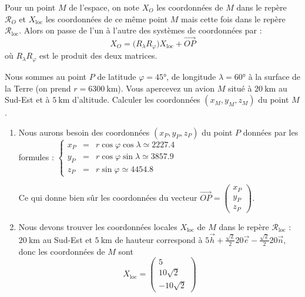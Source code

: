 \documentclass[class=report,crop=false]{standalone}
\newcommand{\vect}{\overrightarrow}
\begin{document}
Pour un point $M$ de l'espace, on note
$X_O$ les coordonnées de $M$ dans le repère $\mathcal{R}_O$
et $X_{\text{loc}}$ les coordonnées de ce même point $M$ 
mais cette fois dans le repère $\mathcal{R}_{\text{loc}}$.
Alors on passe de l'un à l'autre des systèmes de coordonnées par :
$$X_O =  \big(R_\lambda R_\varphi\big) X_{\text{loc}} + \vect{OP}$$
où $R_\lambda R_\varphi$ est le produit des deux matrices.

\begin{exemple}
Nous sommes au point $P$ de latitude $\varphi = \ang{45}$, de longitude 
$\lambda = \ang{60}$ à la surface de la Terre (on prend $r= \SI{6300}{\kilo\meter}$).
Vous apercevez un avion $M$ situé à $\SI{20}{\kilo\meter}$ au Sud-Est et à 
$\SI{5}{\kilo\meter}$ d'altitude. Calculer les coordonnées $(x_M,y_M,z_M)$ du point $M$.

\begin{enumerate}
  \item Nous aurons besoin des coordonnées $(x_P,y_P,z_P)$ du point $P$ données
par les formules :
$\left\{\begin{array}{rcl}
x_P & = & r \cos \varphi \cos \lambda \simeq \num{2227.4}\\
y_P & = & r \cos \varphi \sin \lambda \simeq \num{3857.9}\\
z_P & = & r \sin \varphi \simeq \num{4454.8}
\end{array}\right.$

Ce qui donne bien sûr les coordonnées du vecteur 
$\vect{OP}=\left(\begin{smallmatrix}x_P\\y_P\\z_P\end{smallmatrix}\right)$.
  
  \item Nous devons trouver les coordonnées locales $X_{\text{loc}}$ de $M$ dans le repère
  $\mathcal{R}_{\text{loc}}$ : $\SI{20}{\kilo\meter}$ au Sud-Est et $\SI{5}{\kilo\meter}$ de hauteur
  correspond à $5 \vect{h} + \frac{\sqrt{2}}{2} 20 \vect{e}-\frac{\sqrt{2}}{2} 20 \vect{n}$, donc les coordonnées de $M$ sont 
  $$X_{\text{loc}} = \begin{pmatrix} 5\\10\sqrt{2}\\-10\sqrt{2}\end{pmatrix}$$
  

\end{enumerate}
\end{exemple}
\end{document}
